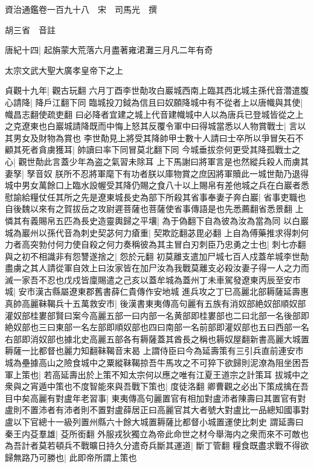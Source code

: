 資治通鑑卷一百九十八　宋　司馬光　撰

胡三省　音註

唐紀十四|{
	起旃蒙大荒落六月盡著雍涒灘三月凡二年有奇}


太宗文武大聖大廣孝皇帝下之上

貞觀十九年|{
	觀古玩翻}
六月丁酉李世勣攻白巖城西南上臨其西北城主孫代音濳遣腹心請降|{
	降戶江翻下同}
臨城投刀鉞為信且曰奴願降城中有不從者上以唐幟與其使|{
	幟昌志翻使疏吏翻}
曰必降者宜建之城上代音建幟城中人以為唐兵已登城皆從之上之克遼東也白巖城請降既而中悔上怒其反覆令軍中曰得城當悉以人物賞戰士|{
	言以其男女及財物為賞也}
李世勣見上將受其降帥甲士數十人請曰士卒所以爭冒矢石不顧其死者貪虜獲耳|{
	帥讀曰率下同冒莫北翻下同}
今城垂拔奈何更受其降孤戰士之心|{
	觀世勣此言蓋少年為盗之氣習未除耳}
上下馬謝曰將軍言是也然縱兵殺人而虜其妻孥|{
	孥音奴}
朕所不忍將軍麾下有功者朕以庫物賞之庶因將軍贖此一城世勣乃退得城中男女萬餘口上臨水設幄受其降仍賜之食八十以上賜帛有差他城之兵在白巖者悉慰諭給糧仗任其所之先是遼東城長史為部下所殺其省事奉妻子奔白巖|{
	省事吏職也自後魏以來有之賀拔岳之攻尉遲菩薩也菩薩使省事傳語是也先悉薦翻省悉景翻}
上憐其有義賜帛五匹為長史造靈輿歸之平壤|{
	為于偽翻下自為彼為汝為當為同}
以白巖城為巖州以孫代音為刺史契苾何力瘡重|{
	契欺訖翻苾毘必翻}
上自為傅藥推求得刺何力者高突勃付何力使自殺之何力奏稱彼為其主冒白刃刺臣乃忠勇之士也|{
	刺七亦翻}
與之初不相識非有怨讐遂捨之|{
	怨於元翻}
初莫離支遣加尸城七百人戍蓋牟城李世勣盡虜之其人請從軍自效上曰汝家皆在加尸汝為我戰莫離支必殺汝妻子得一人之力而滅一家吾不忍也戊戍皆廩賜遣之己亥以蓋牟城為蓋州丁未車駕發遼東丙辰至安市城|{
	安市漢古縣屬遼東郡舊書薛仁貴傳作安地城}
進兵攻之丁巳高麗北部耨薩延壽惠真帥高麗靺鞨兵十五萬救安市|{
	後漢書東夷傳高句麗有五族有消奴部絶奴部順奴部灌奴部桂婁部賢曰案今高麗五部一曰内部一名黄部即桂婁部也二曰北部一名後部即絶奴部也三曰東部一名左部即順奴部也四曰南部一名前部即灌奴部也五曰西部一名右部即消奴部也據北史高麗五部各有耨薩蓋其酋長之稱也耨奴屋翻新書高麗大城置耨薩一比都督也麗力知翻靺鞨音末曷}
上謂侍臣曰今為延壽策有三引兵直前連安市城為壘據高山之險食城中之粟縱靺鞨掠吾牛馬攻之不可猝下欲歸則泥潦為阻坐困吾軍上策也|{
	若高延壽出於上策不知太宗何以應之唯有江夏王道宗之計策耳}
拔城中之衆與之宵遁中策也不度智能來與吾戰下策也|{
	度徒洛翻}
卿曹觀之必出下策成擒在吾目中矣高麗有對盧年老習事|{
	東夷傳高句麗置官有相加對盧沛者陳壽曰其置官有對盧則不置沛者有沛者則不置對盧薛居正曰高麗官其大者號大對盧比一品總知國事對盧以下官總十一級列置州縣六十餘大城置耨薩比都督小城置運使比刺史}
謂延壽曰秦王内芟羣雄|{
	芟所銜翻}
外服戎狄獨立為帝此命世之材今舉海内之衆而來不可敵也為吾計者莫若頓兵不戰曠日持久分遣奇兵斷其運道|{
	斷丁管翻}
糧食既盡求戰不得欲歸無路乃可勝也|{
	此即帝所謂上策也}
